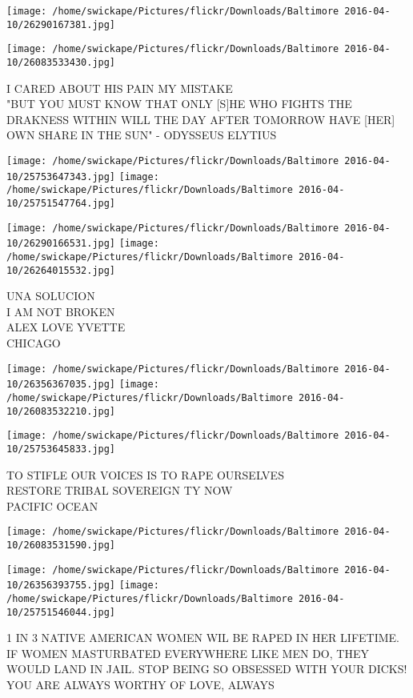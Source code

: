 \documentclass[10pt,letterpaper]{article}
\begin{document}
\texttt{[image: /home/swickape/Pictures/flickr/Downloads/Baltimore 2016-04-10/26290167381.jpg]}

\vspace{0.25in}
\texttt{[image: /home/swickape/Pictures/flickr/Downloads/Baltimore 2016-04-10/26083533430.jpg]}

I CARED ABOUT HIS PAIN MY MISTAKE\\
"BUT YOU MUST KNOW THAT ONLY {[}S{]}HE WHO FIGHTS THE DRAKNESS WITHIN WILL THE DAY AFTER TOMORROW HAVE {[}HER{]} OWN SHARE IN THE SUN" {-} ODYSSEUS ELYTIUS
\pagebreak

\texttt{[image: /home/swickape/Pictures/flickr/Downloads/Baltimore 2016-04-10/25753647343.jpg]}
\texttt{[image: /home/swickape/Pictures/flickr/Downloads/Baltimore 2016-04-10/25751547764.jpg]}

\texttt{[image: /home/swickape/Pictures/flickr/Downloads/Baltimore 2016-04-10/26290166531.jpg]}
\texttt{[image: /home/swickape/Pictures/flickr/Downloads/Baltimore 2016-04-10/26264015532.jpg]}

UNA SOLUCION\\
I AM NOT BROKEN\\
ALEX LOVE YVETTE\\
CHICAGO
\pagebreak

\texttt{[image: /home/swickape/Pictures/flickr/Downloads/Baltimore 2016-04-10/26356367035.jpg]}
\texttt{[image: /home/swickape/Pictures/flickr/Downloads/Baltimore 2016-04-10/26083532210.jpg]}

\texttt{[image: /home/swickape/Pictures/flickr/Downloads/Baltimore 2016-04-10/25753645833.jpg]}

TO STIFLE OUR VOICES IS TO RAPE OURSELVES\\
RESTORE TRIBAL SOVEREIGN TY NOW\\
PACIFIC OCEAN
\pagebreak

\texttt{[image: /home/swickape/Pictures/flickr/Downloads/Baltimore 2016-04-10/26083531590.jpg]}

\vspace{0.25in}
\texttt{[image: /home/swickape/Pictures/flickr/Downloads/Baltimore 2016-04-10/26356393755.jpg]}
\texttt{[image: /home/swickape/Pictures/flickr/Downloads/Baltimore 2016-04-10/25751546044.jpg]}

1 IN 3 NATIVE AMERICAN WOMEN WIL BE RAPED IN HER LIFETIME.\\
IF WOMEN MASTURBATED EVERYWHERE LIKE MEN DO, THEY WOULD LAND IN JAIL.  STOP BEING SO OBSESSED WITH YOUR DICKS!\\
YOU ARE ALWAYS WORTHY OF LOVE, ALWAYS
\pagebreak
\end{document}
